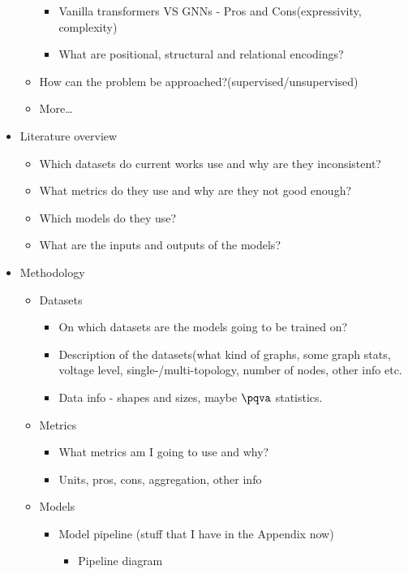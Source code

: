 \begin{itemize}
\begin{itemize}
\begin{itemize}
            \item Vanilla transformers VS GNNs - Pros and Cons(expressivity, complexity)
            \item What are positional, structural and relational encodings?
        \end{itemize}
        \item How can the problem be approached?(supervised/unsupervised)
        \item More\ldots
    \end{itemize}
    \item Literature overview
    \begin{itemize}
        \item Which datasets do current works use and why are they inconsistent?
        \item What metrics do they use and why are they not good enough?
        \item Which models do they use?
        \item What are the inputs and outputs of the models?
    \end{itemize}
    \item Methodology
    \begin{itemize}
        \item Datasets
        \begin{itemize}
            \item On which datasets are the models going to be trained on?
            \item Description of the datasets(what kind of graphs, some graph stats, voltage level, single-/multi-topology, number of nodes, other info etc.
            \item Data info - shapes and sizes, maybe $\pqva$ statistics.
        \end{itemize}
        \item Metrics
        \begin{itemize}
            \item What metrics am I going to use and why?
            \item Units, pros, cons, aggregation, other info
        \end{itemize}
        \item Models
        \begin{itemize}
            \item Model pipeline (stuff that I have in the Appendix now)
            \begin{itemize}
                \item Pipeline diagram

\end{itemize}
\end{itemize}
\end{itemize}
\end{itemize}
